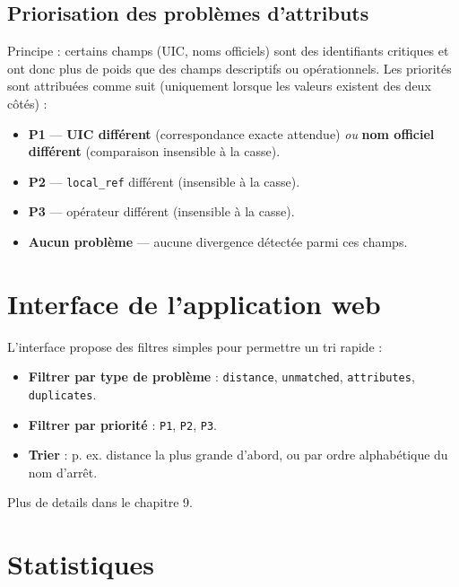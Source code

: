 \subsection{Priorisation des problèmes d'attributs}
Principe : certains champs (UIC, noms officiels) sont des identifiants critiques et ont donc plus de poids que des champs descriptifs ou opérationnels. Les priorités sont attribuées comme suit (uniquement lorsque les valeurs existent des deux côtés) :
\begin{itemize}
  \item \textbf{P1} — \textbf{UIC différent} (correspondance exacte attendue) \emph{ou} \textbf{nom officiel différent} (comparaison insensible à la casse).
  \item \textbf{P2} — \texttt{local\_ref} différent (insensible à la casse).
  \item \textbf{P3} — opérateur différent (insensible à la casse).
  \item \textbf{Aucun problème} — aucune divergence détectée parmi ces champs.
\end{itemize}

\section{Interface de l'application web}
L'interface propose des filtres simples pour permettre un tri rapide :
\begin{itemize}
  \item \textbf{Filtrer par type de problème} : \texttt{distance}, \texttt{unmatched}, \texttt{attributes}, \texttt{duplicates}.
  \item \textbf{Filtrer par priorité} : \texttt{P1}, \texttt{P2}, \texttt{P3}.
  \item \textbf{Trier} : p. ex. distance la plus grande d'abord, ou par ordre alphabétique du nom d'arrêt.
\end{itemize}

Plus de details dans le chapitre 9.


\section{Statistiques }

